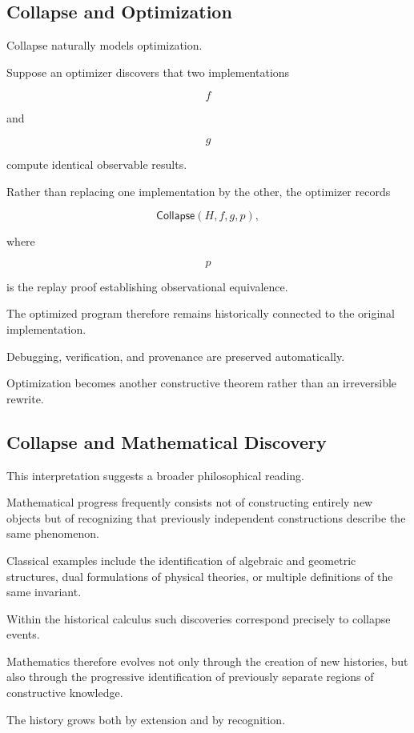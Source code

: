 \documentclass[12pt,oneside]{article}
\theoremstyle{definition}
\theoremstyle{remark}
\newcommand{\Collapse}{\mathsf{Collapse}}
\begin{document}
\subsection{Collapse and Optimization}

Collapse naturally models optimization.

Suppose an optimizer discovers that two implementations

\[
f
\]

and

\[
g
\]

compute identical observable results.

Rather than replacing one implementation by the other, the optimizer records

\[
\Collapse(H,f,g,p),
\]

where

\[
p
\]

is the replay proof establishing observational equivalence.

The optimized program therefore remains historically connected to the original
implementation.

Debugging, verification, and provenance are preserved automatically.

Optimization becomes another constructive theorem rather than an irreversible
rewrite.

\subsection{Collapse and Mathematical Discovery}

This interpretation suggests a broader philosophical reading.

Mathematical progress frequently consists not of constructing entirely new
objects but of recognizing that previously independent constructions describe
the same phenomenon.

Classical examples include the identification of algebraic and geometric
structures, dual formulations of physical theories, or multiple definitions of
the same invariant.

Within the historical calculus such discoveries correspond precisely to
collapse events.

Mathematics therefore evolves not only through the creation of new histories,
but also through the progressive identification of previously separate regions
of constructive knowledge.

The history grows both by extension and by recognition.
\end{document}
